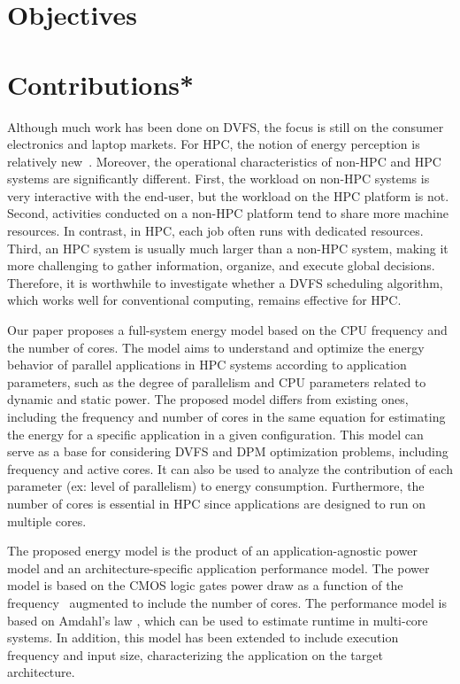 \section{Objectives} \label{sec:objectives}


\section{Contributions*} \label{sec:contributions}

Although much work has been done on DVFS, the focus is still on the consumer electronics and laptop markets. 
For HPC, the notion of energy perception is relatively new~\cite{Feng2003MakingSupercomputing}. 
Moreover, the operational characteristics of non-HPC and HPC systems are significantly different. 
First, the workload on non-HPC systems is very interactive with the end-user, but the workload on the HPC platform is not.
Second, activities conducted on a non-HPC platform tend to share more machine resources.
In contrast, in HPC, each job often runs with dedicated resources. 
Third, an HPC system is usually much larger than a non-HPC system, making it more challenging to gather information, organize, and execute global decisions.
Therefore, it is worthwhile to investigate whether a DVFS scheduling algorithm, which works well for conventional computing, remains effective for HPC.

Our paper proposes a full-system energy model based on the CPU frequency and the number of cores. The model aims to understand and optimize the energy behavior of parallel applications in HPC systems according to application parameters, such as the degree of parallelism and CPU parameters related to dynamic and static power. The proposed model differs from existing ones, including the frequency and number of cores in the same equation for estimating the energy for a specific application in a given configuration. This model can serve as a base for considering DVFS and DPM optimization problems, including frequency and active cores. It can also be used to analyze the contribution of each parameter (ex: level of parallelism) to energy consumption. Furthermore, the number of cores is essential in HPC since applications are designed to run on multiple cores.

The proposed energy model is the product of an application-agnostic power model and an architecture-specific application performance model. The power model is based on the CMOS logic gates power draw as a function of the frequency~\cite{Sarwar1997CmosCalculation, Butzen2007LeakageGates} augmented to include the number of cores. The performance model is based on Amdahl's law \cite{Amdahl1967ValidityCapabilities, Eyerman2010ModelingDesign, Gustafson1988ReevaluatingLaw}, which can be used to estimate runtime in multi-core systems. In addition, this model has been extended to include execution frequency and input size, characterizing the application on the target architecture.


